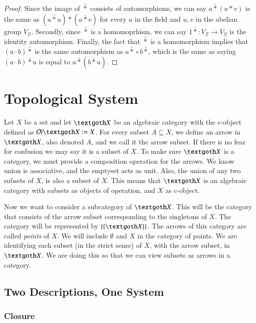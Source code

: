 \documentclass [12pt]{book}
\begin{document}
\begin{proof}Since the image of $\bar*$ consists of automorphisms, we can say $a\bar*(u*v)$ is the same as $(a\bar*u)*(a\bar*v)$ for every $a$ in the field and $u,v$ in the abelian group $V_\mathcal G$. Secondly, since $\bar*$ is a homomoprhism, we can say $1\bar*:V_\mathcal G\rightarrow V_\mathcal G$ is the identity automorphism. Finally, the fact that $\bar*$ is a homomorphism implies that $(a\cdot b)\bar*$ is the same automorphism as $a\bar*\circ b\bar*$, which is the same as saying $(a\cdot b)\bar*u$ is equal to $a\bar*(b\bar*u)$.\end{proof}

\chapter{Topological System}

Let $X$ be a set and let $\textgoth X$ be an algebraic category with the c-object defined as $\mathcal O|\textgoth X:=X$. For every subset $A\subseteq X$, we define an arrow in $\textgoth X$, also denoted $A$, and we call it the arrow subset. If there is no fear for confusion we may say it is a subset of $X$. To make sure $\textgoth X$ is a category, we must provide a composition operation for the arrows. We know union is associative, and the emptyset acts as unit. Also, the union of any two subsets of $X$, is also a subset of $X$. This means that $\textgoth X$ is an algebraic category with subsets as objects of operation, and $X$ as c-object.

Now we want to consider a subcategory of $\textgoth X$. This will be the category that consists of the arrow subset corresponding to the singletons of $X$. The category will be represented by $\{\{\textgoth X\}\}$. The arrows of this category are called \textit{points} of $X$. We will include $\emptyset$ and $X$ in the category of points. We are identifying each subset (in the strict sense) of $X$, with the arrow subset, in $\textgoth X$. We are doing this so that we can view subsets as arrows in a category.

		\section{Two Descriptions, One System}
	
		\subsection{Closure}
\end{document}
